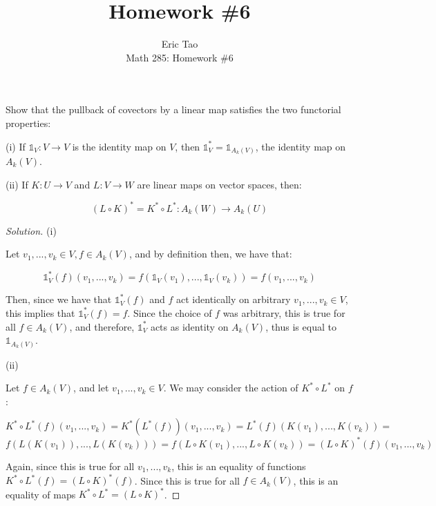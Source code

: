 \documentclass[10pt]{article}
\theoremstyle{nonumberplain}%
\newenvironment{problem}[2][]{\begin{trivlist}
\item[\hskip \labelsep {\bfseries #1}\hskip \labelsep {\bfseries #2.}]}{\end{trivlist}}
\begin{document}
 
\title{Homework \#6}
\author{Eric Tao\\
Math 285: Homework \#6}
\maketitle

\begin{problem}{Question 1}

Show that the pullback of covectors by a linear map satisfies the two functorial properties:

(i) If $\mathds{1}_{V}: V \to V$ is the identity map on $V$, then $\mathds{1}^*_V = \mathds{1}_{A_k(V)}$, the identity map on $A_k(V)$.

(ii) If $K: U \to V$ and $L: V \to W$ are linear maps on vector spaces, then:

$$(L \circ K)^* = K^* \circ L^*: A_k(W) \to A_k(U) $$


\end{problem}

\begin{proof}[Solution]

(i)

Let $v_1,...,v_k \in V, f \in A_k(V)$, and by definition then, we have that:

$$ \mathds{1}^*_V(f)(v_1,...,v_k) = f(\mathds{1}_V(v_1),...,\mathds{1}_V(v_k)) = f(v_1,...,v_k)$$

Then, since we have that $\mathds{1}^*_V(f)$ and $f$ act identically on arbitrary $v_1,...,v_k \in V$, this implies that $\mathds{1}^*_V(f) = f$. Since the choice of $f$ was arbitrary, this is true for all $f \in A_k(V)$, and therefore, $\mathds{1}^*_V$ acts as identity on $A_k(V)$, thus is equal to $\mathds{1}_{A_k(V)}$.

(ii)

Let $f \in A_k(V)$, and let $v_1,...,v_k \in V$. We may consider the action of $K^* \circ L^*$ on $f$:

$$ K^* \circ L^*(f) (v_1,...,v_k) = K^*(L^*(f))(v_1,...,v_k) = L^*(f) (K(v_1),...,K(v_k)) =$$
$$ f(L(K(v_1)),...,L(K(v_k))) = f(L\circ K(v_1),...,L \circ K(v_k)) = (L \circ K)^*(f) (v_1,...,v_k)$$

Again, since this is true for all $v_1,...,v_k$, this is an equality of functions $K^* \circ L^* (f) = (L \circ K)^* (f)$. Since this is true for all $f \in A_k(V)$, this is an equality of maps $K^* \circ L^* = (L \circ K)^*$. 

\end{proof}
\end{document}
